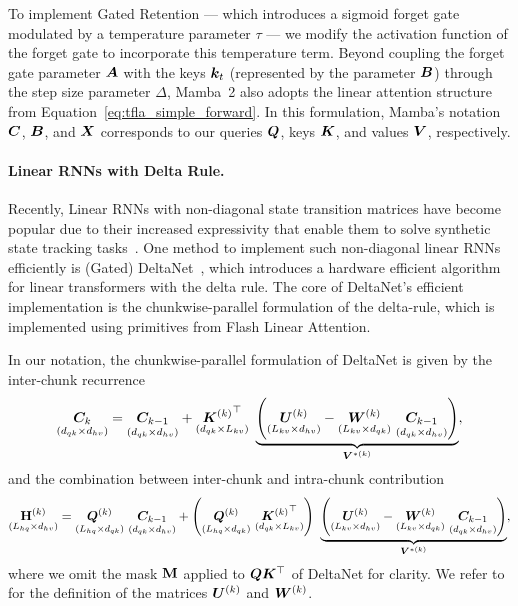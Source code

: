 \documentclass{article}
\begin{document}
    To implement Gated Retention --- which introduces a sigmoid forget gate modulated by a temperature parameter $\tau$ --- we modify the activation function of the forget gate to incorporate this temperature term. 
    Beyond coupling the forget gate parameter $\bm{A}$ with the keys $\bm{k}_t$ (represented by the parameter $\bm{B}$) through the step size parameter $\Delta$, Mamba~2 also adopts the linear attention structure from Equation~\eqref{eq:tfla_simple_forward}. In this formulation, Mamba’s notation $\bm{C}$, $\bm{B}$, and $\bm{X}$ corresponds to our queries $\bm{Q}$, keys $\bm{K}$, and values $\bm{V}$, respectively.

    \paragraph{Linear RNNs with Delta Rule.}
    Recently, Linear RNNs with non-diagonal state transition matrices have become popular due to their increased expressivity that enable them to solve synthetic state tracking tasks~\citep{grazzi:25unlocking, siems:25deltaproduct, peng:25rwkv7, movahedi:25fixedpointrnnsdiagonaldense}. 
    One method to implement such non-diagonal linear RNNs efficiently is (Gated) DeltaNet~\citep{yang:24parallelizing, yang:24gateddeltanet}, which introduces a hardware efficient algorithm for linear transformers with the delta rule. 
    The core of DeltaNet's efficient implementation is the chunkwise-parallel formulation of the delta-rule, which is implemented using primitives from Flash Linear Attention. 
    
    In our notation, the chunkwise-parallel formulation of DeltaNet is given by the inter-chunk recurrence
    \begin{equation}
        \label{eq:deltanet_inter}
            \underset{(d_{qk} \times d_{hv})}{\BC_k} = \underset{(d_{qk} \times d_{hv})}{\BC_{k-1}} + \underset{(d_{qk} \times L_{kv})}{{\BK^{(k)}}^\top} \ \underbrace{\left(\underset{(L_{kv} \times d_{hv})}{\BU^{(k)}} - \underset{(L_{kv} \times d_{qk})}{\BW^{(k)}} \ \underset{(d_{qk} \times d_{hv})}{\BC_{k-1}}\right)}_{\BV^{*(k)}},
    \end{equation}
    and the combination between inter-chunk and intra-chunk contribution
    \begin{equation}
        \label{eq:deltanet_output}
            \underset{(L_{hq} \times d_{hv})}{\bm{\rH}^{(k)}} = \underset{(L_{hq} \times d_{qk})}{\BQ^{(k)}} \ \underset{(d_{qk} \times d_{hv})}{\BC_{k-1}} + \left(\underset{(L_{hq} \times d_{qk})}{\BQ^{(k)}} \ \underset{(d_{qk} \times L_{kv})}{{\BK^{(k)}}^\top} \right) \ \underbrace{\left(\underset{(L_{kv} \times d_{hv})}{\BU^{(k)}} - \underset{(L_{kv} \times d_{qk})}{\BW^{(k)}} \ \underset{(d_{qk} \times d_{hv})}{\BC_{k-1}}\right)}_{\BV^{*(k)}},      
    \end{equation}
    where we omit the mask $\bm{\mathrm{M}}$ applied to $\bm{Q}\bm{K}^\top$ of DeltaNet for clarity.
    We refer to \citet{yang:24parallelizing} for the definition of the matrices $\bm{U}^{(k)}$ and $\bm{W}^{(k)}$.
\end{document}
